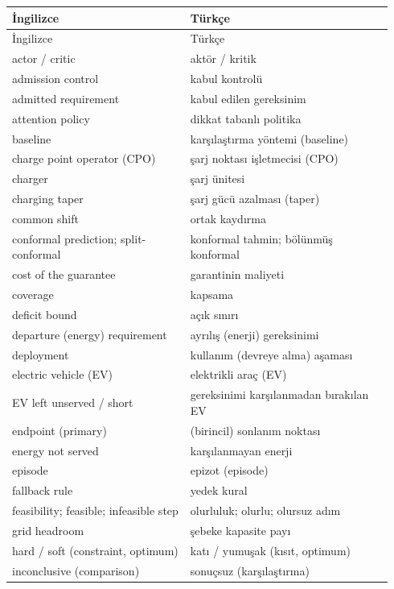{\small
\setlength{\LTpre}{2pt}\setlength{\LTpost}{0pt}
\begin{longtable}{@{}>{\raggedright}p{0.44\linewidth}>{\raggedright\arraybackslash}p{0.50\linewidth}@{}}
\toprule
İngilizce & Türkçe \\
\midrule
\endfirsthead
\toprule
İngilizce & Türkçe \\
\midrule
\endhead
\bottomrule
\endfoot
actor / critic & aktör / kritik \\
admission control & kabul kontrolü \\
admitted requirement & kabul edilen gereksinim \\
attention policy & dikkat tabanlı politika \\
baseline & karşılaştırma yöntemi (baseline) \\
charge point operator (CPO) & şarj noktası işletmecisi (CPO) \\
charger & şarj ünitesi \\
charging taper & şarj gücü azalması (taper) \\
common shift & ortak kaydırma \\
conformal prediction; split-conformal & konformal tahmin; bölünmüş konformal \\
cost of the guarantee & garantinin maliyeti \\
coverage & kapsama \\
deficit bound & açık sınırı \\
departure (energy) requirement & ayrılış (enerji) gereksinimi \\
deployment & kullanım (devreye alma) aşaması \\
electric vehicle (EV) & elektrikli araç (EV) \\
EV left unserved / short & gereksinimi karşılanmadan bırakılan EV \\
endpoint (primary) & (birincil) sonlanım noktası \\
energy not served & karşılanmayan enerji \\
episode & epizot (episode) \\
fallback rule & yedek kural \\
feasibility; feasible; infeasible step & olurluluk; olurlu; olursuz adım \\
grid headroom & şebeke kapasite payı \\
hard / soft (constraint, optimum) & katı / yumuşak (kısıt, optimum) \\
inconclusive (comparison) & sonuçsuz (karşılaştırma) \\

\end{longtable}}
